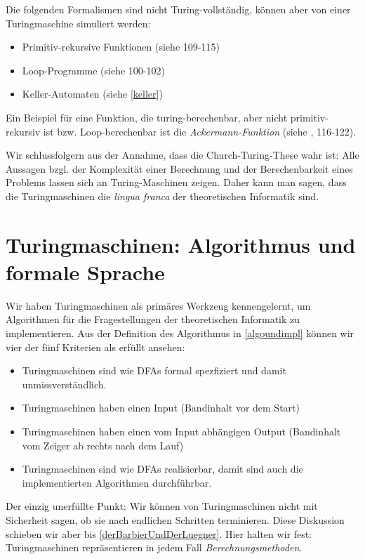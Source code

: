 Die folgenden Formalismen sind nicht Turing-vollständig,
können aber von einer Turingmaschine simuliert werden:
\begin{itemize}
    \item Primitiv-rekursive Funktionen (siehe \cite{schoening} 109-115)
    \item Loop-Programme (siehe \cite{schoening} 100-102)
    \item Keller-Automaten (siehe \autoref{keller})
\end{itemize}
Ein Beispiel für eine Funktion,
die turing-berechenbar, aber nicht primitiv-rekursiv ist bzw. Loop-berechenbar
ist die \emph{Ackermann-Funktion} (siehe \cite{schoening}, 116-122).

Wir schlussfolgern aus der Annahme,
dass die Church-Turing-These wahr ist:
Alle Aussagen bzgl. der Komplexität einer Berechnung und der Berechenbarkeit eines Problems
lassen sich an Turing-Maschinen zeigen.
Daher kann man sagen,
dass die Turingmaschinen die \emph{lingua franca} der theoretischen Informatik sind.

\section{Turingmaschinen: Algorithmus und formale Sprache}
Wir haben Turingmaschinen als primäres Werkzeug kennengelernt,
um Algorithmen für die Fragestellungen der theoretischen Informatik zu implementieren.
Aus der Definition des Algorithmus in \autoref{algoundimpl}
können wir vier der fünf Kriterien als erfüllt ansehen:
\begin{itemize}
    \item Turingmaschinen sind wie DFAs formal spezfiziert und damit unmissverständlich.
    \item Turingmaschinen haben einen Input (Bandinhalt vor dem Start)
    \item Turingmaschinen haben einen vom Input abhängigen Output
        (Bandinhalt vom Zeiger ab rechts nach dem Lauf)
    \item Turingmaschinen sind wie DFAs realisierbar,
        damit sind auch die implementierten Algorithmen durchführbar.
\end{itemize}
Der einzig unerfüllte Punkt:
Wir können von Turingmaschinen nicht mit Sicherheit sagen,
ob sie nach endlichen Schritten terminieren.
Diese Diskussion schieben wir aber bis \autoref{derBarbierUndDerLuegner}.
Hier halten wir fest: Turingmaschinen repräsentieren in jedem Fall \emph{Berechnungsmethoden}.

